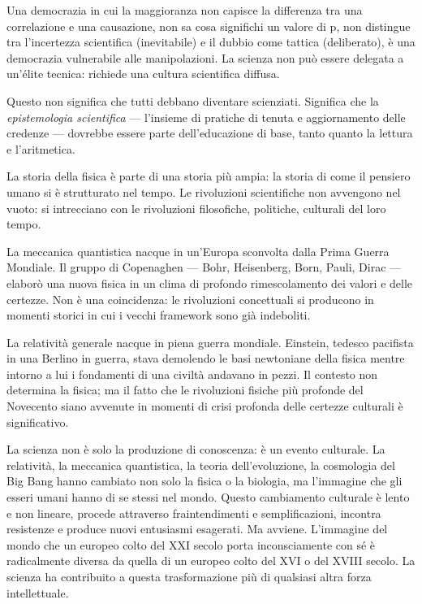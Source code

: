 \documentclass[12pt,a4paper,openany]{book}
\newcommand{\sezione}[1]{\vspace{1.2em}{\large\bfseries #1}\vspace{0.5em}\par}
\begin{document}
Una democrazia in cui la maggioranza non capisce la differenza tra una correlazione e una causazione, non sa cosa significhi un valore di p, non distingue tra l'incertezza scientifica (inevitabile) e il dubbio come tattica (deliberato), è una democrazia vulnerabile alle manipolazioni. La scienza non può essere delegata a un'élite tecnica: richiede una cultura scientifica diffusa.

Questo non significa che tutti debbano diventare scienziati. Significa che la \textit{epistemologia scientifica} --- l'insieme di pratiche di tenuta e aggiornamento delle credenze --- dovrebbe essere parte dell'educazione di base, tanto quanto la lettura e l'aritmetica.

\sezione{Dalla storia della fisica alla storia del pensiero}

La storia della fisica è parte di una storia più ampia: la storia di come il pensiero umano si è strutturato nel tempo. Le rivoluzioni scientifiche non avvengono nel vuoto: si intrecciano con le rivoluzioni filosofiche, politiche, culturali del loro tempo.

La meccanica quantistica nacque in un'Europa sconvolta dalla Prima Guerra Mondiale. Il gruppo di Copenaghen --- Bohr, Heisenberg, Born, Pauli, Dirac --- elaborò una nuova fisica in un clima di profondo rimescolamento dei valori e delle certezze. Non è una coincidenza: le rivoluzioni concettuali si producono in momenti storici in cui i vecchi framework sono già indeboliti.

La relatività generale nacque in piena guerra mondiale. Einstein, tedesco pacifista in una Berlino in guerra, stava demolendo le basi newtoniane della fisica mentre intorno a lui i fondamenti di una civiltà andavano in pezzi. Il contesto non determina la fisica; ma il fatto che le rivoluzioni fisiche più profonde del Novecento siano avvenute in momenti di crisi profonda delle certezze culturali è significativo.

La scienza non è solo la produzione di conoscenza: è un evento culturale. La relatività, la meccanica quantistica, la teoria dell'evoluzione, la cosmologia del Big Bang hanno cambiato non solo la fisica o la biologia, ma l'immagine che gli esseri umani hanno di se stessi nel mondo. Questo cambiamento culturale è lento e non lineare, procede attraverso fraintendimenti e semplificazioni, incontra resistenze e produce nuovi entusiasmi esagerati. Ma avviene. L'immagine del mondo che un europeo colto del XXI secolo porta inconsciamente con sé è radicalmente diversa da quella di un europeo colto del XVI o del XVIII secolo. La scienza ha contribuito a questa trasformazione più di qualsiasi altra forza intellettuale.
\end{document}
